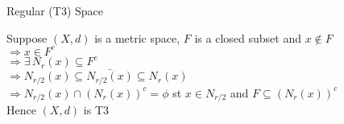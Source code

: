 \documentclass{article}
\begin{document}
Regular (T3) Space
\begin{tcolorbox}[colback=lightgray!10,colframe=lightgray!10, fontupper=\linespread{1.5}\selectfont]
	Suppose $(X,d)$ is a metric space, $F$ is a closed subset and $x \not\in F$ \\
	$\Rightarrow x \in F^c$ \\
	$\Rightarrow \exists \, N_r(x) \subseteq F^c$ \\
	$\Rightarrow N_{r/2}(x) \subseteq \bar{N_{r/2}(x)} \subseteq N_r(x)$ \\
	$\Rightarrow N_{r/2}(x) \cap (N_r(x))^c = \phi$ st $x \in N_{r/2}$ and $F \subseteq (N_r(x))^c$ \\
	Hence $(X,d)$ is T3
\end{tcolorbox}
\end{document}
